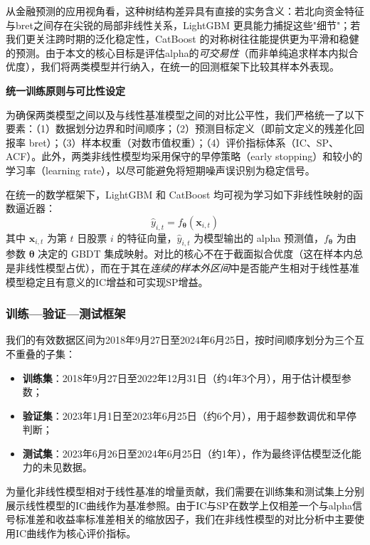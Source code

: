 \documentclass{article}
\begin{document}
从金融预测的应用视角看，这种树结构差异具有直接的实务含义：若北向资金特征与bret之间存在尖锐的局部非线性关系，LightGBM 更具能力捕捉这些"细节"；若我们更关注跨时期的泛化稳定性，CatBoost 的对称树往往能提供更为平滑和稳健的预测。由于本文的核心目标是评估alpha的\textit{可交易性}（而非单纯追求样本内拟合优度），我们将两类模型并行纳入，在统一的回测框架下比较其样本外表现。

\vspace{0.3em}
\noindent\textbf{统一训练原则与可比性设定}

为确保两类模型之间以及与线性基准模型之间的对比公平性，我们严格统一了以下要素：（1）数据划分边界和时间顺序；（2）预测目标定义（即前文定义的残差化回报率 bret）；（3）样本权重（对数市值权重）；（4）评价指标体系（IC、SP、ACF）。此外，两类非线性模型均采用保守的早停策略（early stopping）和较小的学习率（learning rate），以尽可能避免将短期噪声误识别为稳定信号。

在统一的数学框架下，LightGBM 和 CatBoost 均可视为学习如下非线性映射的函数逼近器：
\begin{equation}
    \hat{y}_{i,t} = f_{\boldsymbol{\theta}}(\mathbf{x}_{i,t})
    \label{eq:nonlinear_map}
\end{equation}
\noindent 其中 $\mathbf{x}_{i,t}$ 为第 $t$ 日股票 $i$ 的特征向量，$\hat{y}_{i,t}$ 为模型输出的 alpha 预测值，$f_{\boldsymbol{\theta}}$ 为由参数 $\boldsymbol{\theta}$ 决定的 GBDT 集成映射。对比的核心不在于截面拟合优度（这在样本内总是非线性模型占优），而在于其在\textit{连续的样本外区间}中是否能产生相对于线性基准模型稳定且有意义的IC增益和可实现SP增益。

\subsubsection{训练—验证—测试框架}

我们的有效数据区间为2018年9月27日至2024年6月25日，按时间顺序划分为三个互不重叠的子集：

\begin{itemize}
    \item \textbf{训练集}：2018年9月27日至2022年12月31日（约4年3个月），用于估计模型参数；
    \item \textbf{验证集}：2023年1月1日至2023年6月25日（约6个月），用于超参数调优和早停判断；
    \item \textbf{测试集}：2023年6月26日至2024年6月25日（约1年），作为最终评估模型泛化能力的未见数据。
\end{itemize}

为量化非线性模型相对于线性基准的增量贡献，我们需要在训练集和测试集上分别展示线性模型的IC曲线作为基准参照。由于IC与SP在数学上仅相差一个与alpha信号标准差和收益率标准差相关的缩放因子，我们在非线性模型的对比分析中主要使用IC曲线作为核心评价指标。
\end{document}
